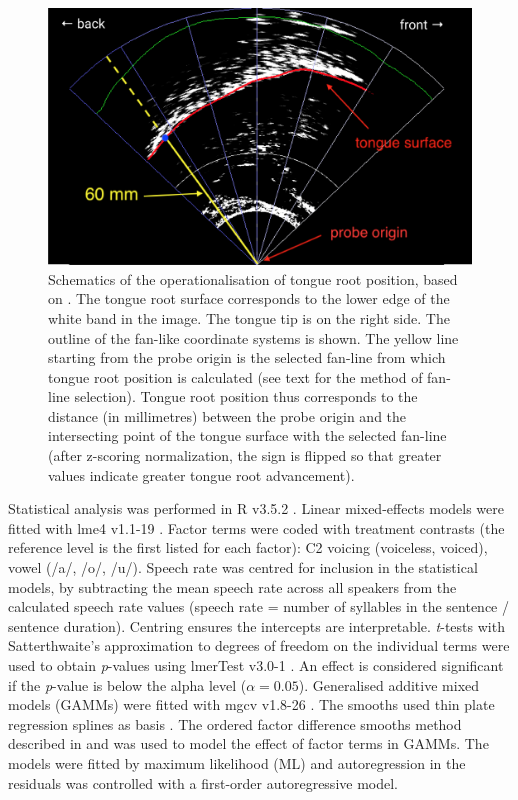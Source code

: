\documentclass[preprint]{JASAnew}
\begin{document}
\begin{figure}
  \centering
  \includegraphics[width=5in]{Figure2.png}
  \caption{Schematics of the operationalisation of tongue root position, based on \citet{kirkham2017}. The tongue root surface corresponds to the lower edge of the white band in the image. The tongue tip is on the right side. The outline of the fan-like coordinate systems is shown. The yellow line starting from the probe origin is the selected fan-line from which tongue root position is calculated (see text for the method of fan-line selection). Tongue root position thus corresponds to the distance (in millimetres) between the probe origin and the intersecting point of the tongue surface with the selected fan-line (after z-scoring normalization, the sign is flipped so that greater values indicate greater tongue root advancement).}
  \label{f:trp}
\end{figure}

Statistical analysis was performed in R v3.5.2 \citep{r-core-team2018}.
Linear mixed-effects models were fitted with lme4 v1.1-19
\citep{bates2015}. Factor terms were coded with treatment contrasts (the
reference level is the first listed for each factor): C2 voicing
(voiceless, voiced), vowel (/a/, /o/, /u/). Speech rate was centred for
inclusion in the statistical models, by subtracting the mean speech rate
across all speakers from the calculated speech rate values (speech rate
= number of syllables in the sentence / sentence duration). Centring
ensures the intercepts are interpretable. \emph{t}-tests with
Satterthwaite's approximation to degrees of freedom on the individual
terms were used to obtain \emph{p}-values using lmerTest v3.0-1
\citep{kuznetsova2017, luke2017}. An effect is considered significant if
the \emph{p}-value is below the alpha level (\(\alpha = 0.05\)).
Generalised additive mixed models (GAMMs) were fitted with mgcv v1.8-26
\citep{wood2011, wood2017}. The smooths used thin plate regression
splines as basis \citep{wood2003}. The ordered factor difference smooths
method described in \citet{soskuthy2017} and \citet{wieling2018} was
used to model the effect of factor terms in GAMMs. The models were
fitted by maximum likelihood (ML) and autoregression in the residuals
was controlled with a first-order autoregressive model.
\end{document}
